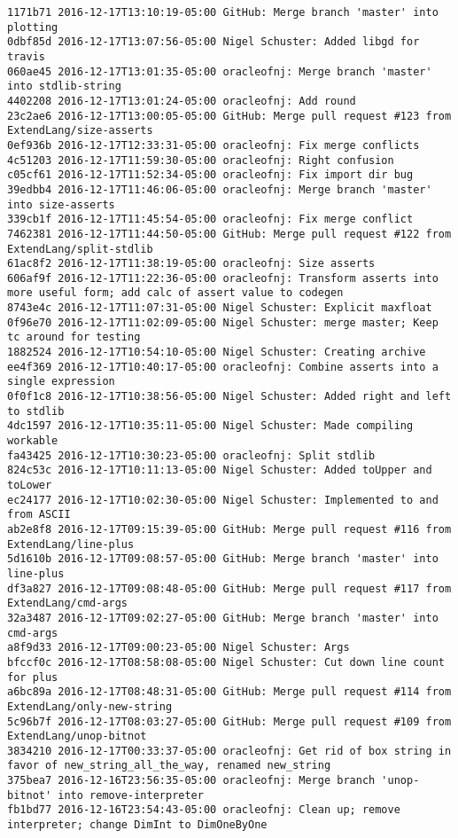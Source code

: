 \begin{lstlisting}
1171b71 2016-12-17T13:10:19-05:00 GitHub: Merge branch 'master' into plotting
0dbf85d 2016-12-17T13:07:56-05:00 Nigel Schuster: Added libgd for travis
060ae45 2016-12-17T13:01:35-05:00 oracleofnj: Merge branch 'master' into stdlib-string
4402208 2016-12-17T13:01:24-05:00 oracleofnj: Add round
23c2ae6 2016-12-17T13:00:05-05:00 GitHub: Merge pull request #123 from ExtendLang/size-asserts
0ef936b 2016-12-17T12:33:31-05:00 oracleofnj: Fix merge conflicts
4c51203 2016-12-17T11:59:30-05:00 oracleofnj: Right confusion
c05cf61 2016-12-17T11:52:34-05:00 oracleofnj: Fix import dir bug
39edbb4 2016-12-17T11:46:06-05:00 oracleofnj: Merge branch 'master' into size-asserts
339cb1f 2016-12-17T11:45:54-05:00 oracleofnj: Fix merge conflict
7462381 2016-12-17T11:44:50-05:00 GitHub: Merge pull request #122 from ExtendLang/split-stdlib
61ac8f2 2016-12-17T11:38:19-05:00 oracleofnj: Size asserts
606af9f 2016-12-17T11:22:36-05:00 oracleofnj: Transform asserts into more useful form; add calc of assert value to codegen
8743e4c 2016-12-17T11:07:31-05:00 Nigel Schuster: Explicit maxfloat
0f96e70 2016-12-17T11:02:09-05:00 Nigel Schuster: merge master; Keep tc around for testing
1882524 2016-12-17T10:54:10-05:00 Nigel Schuster: Creating archive
ee4f369 2016-12-17T10:40:17-05:00 oracleofnj: Combine asserts into a single expression
0f0f1c8 2016-12-17T10:38:56-05:00 Nigel Schuster: Added right and left to stdlib
4dc1597 2016-12-17T10:35:11-05:00 Nigel Schuster: Made compiling workable
fa43425 2016-12-17T10:30:23-05:00 oracleofnj: Split stdlib
824c53c 2016-12-17T10:11:13-05:00 Nigel Schuster: Added toUpper and toLower
ec24177 2016-12-17T10:02:30-05:00 Nigel Schuster: Implemented to and from ASCII
ab2e8f8 2016-12-17T09:15:39-05:00 GitHub: Merge pull request #116 from ExtendLang/line-plus
5d1610b 2016-12-17T09:08:57-05:00 GitHub: Merge branch 'master' into line-plus
df3a827 2016-12-17T09:08:48-05:00 GitHub: Merge pull request #117 from ExtendLang/cmd-args
32a3487 2016-12-17T09:02:27-05:00 GitHub: Merge branch 'master' into cmd-args
a8f9d33 2016-12-17T09:00:23-05:00 Nigel Schuster: Args
bfccf0c 2016-12-17T08:58:08-05:00 Nigel Schuster: Cut down line count for plus
a6bc89a 2016-12-17T08:48:31-05:00 GitHub: Merge pull request #114 from ExtendLang/only-new-string
5c96b7f 2016-12-17T08:03:27-05:00 GitHub: Merge pull request #109 from ExtendLang/unop-bitnot
3834210 2016-12-17T00:33:37-05:00 oracleofnj: Get rid of box string in favor of new_string_all_the_way, renamed new_string
375bea7 2016-12-16T23:56:35-05:00 oracleofnj: Merge branch 'unop-bitnot' into remove-interpreter
fb1bd77 2016-12-16T23:54:43-05:00 oracleofnj: Clean up; remove interpreter; change DimInt to DimOneByOne

\end{lstlisting}
